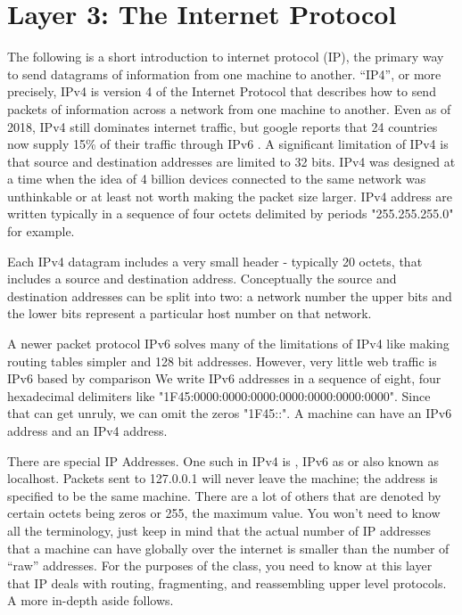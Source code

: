 \section{Layer 3: The Internet Protocol}

The following is a short introduction to internet protocol (IP), the primary way to send datagrams of information from one machine to another.
``IP4'', or more precisely, \gls{IPv4} is version 4 of the Internet Protocol that describes how to send \gls{packets} of information across a network from one machine to another.
Even as of 2018, IPv4 still dominates internet traffic, but google reports that 24 countries now supply 15\% of their traffic through IPv6 \cite{internet_society_2018}.
A significant limitation of IPv4 is that source and destination addresses are limited to 32 bits.
IPv4 was designed at a time when the idea of 4 billion devices connected to the same network was unthinkable or at least not worth making the packet size larger.
\gls{IPv4 address} are written typically in a sequence of four octets delimited by periods "255.255.255.0" for example.

Each IPv4 \gls{datagram} includes a very small header - typically 20 \gls{octets}, that includes a source and destination address.
Conceptually the source and destination addresses can be split into two: a network number the upper bits and the lower bits represent a particular host number on that network.

A newer packet protocol \gls{IPv6} solves many of the limitations of IPv4 like making routing tables simpler and 128 bit addresses.
However, very little web traffic is IPv6 based by comparison \cite{internet_society_2018}
We write IPv6 addresses in a sequence of eight, four hexadecimal delimiters like "1F45:0000:0000:0000:0000:0000:0000:0000".
Since that can get unruly, we can omit the zeros "1F45::". A machine can have an IPv6 address and an IPv4 address.

There are special IP Addresses.
One such in IPv4 is , IPv6 as  or  also known as localhost.
Packets sent to 127.0.0.1 will never leave the machine; the address is specified to be the same machine.
There are a lot of others that are denoted by certain octets being zeros or 255, the maximum value. You won't need to know all the terminology, just keep in mind that the actual number of IP addresses that a machine can have globally over the internet is smaller than the number of ``raw'' addresses.
For the purposes of the class, you need to know at this layer that IP deals with routing, fragmenting, and reassembling upper level protocols. A more in-depth aside follows.

